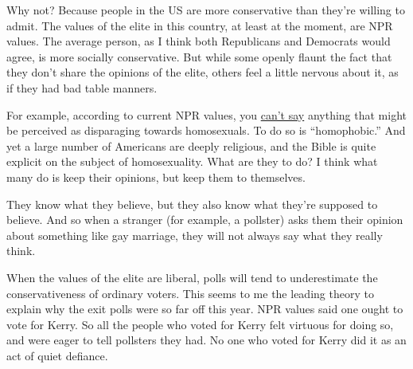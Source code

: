 Why not? Because people in the US are more conservative than they're
willing to admit. The values of the elite in this country, at least at
the moment, are NPR values. The average person, as I think both
Republicans and Democrats would agree, is more socially conservative.
But while some openly flaunt the fact that they don't share the opinions
of the elite, others feel a little nervous about it, as if they had bad
table manners.

For example, according to current NPR values, you \href{say.html}{can't
say} anything that might be perceived as disparaging towards
homosexuals. To do so is ``homophobic.'' And yet a large number of
Americans are deeply religious, and the Bible is quite explicit on the
subject of homosexuality. What are they to do? I think what many do is
keep their opinions, but keep them to themselves.

They know what they believe, but they also know what they're supposed to
believe. And so when a stranger (for example, a pollster) asks them
their opinion about something like gay marriage, they will not always
say what they really think.

When the values of the elite are liberal, polls will tend to
underestimate the conservativeness of ordinary voters. This seems to me
the leading theory to explain why the exit polls were so far off this
year. NPR values said one ought to vote for Kerry. So all the people who
voted for Kerry felt virtuous for doing so, and were eager to tell
pollsters they had. No one who voted for Kerry did it as an act of quiet
defiance.